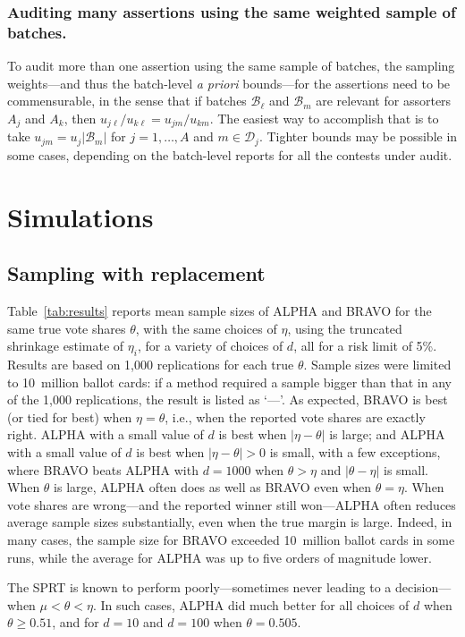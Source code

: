 \documentclass[12pt,runningheads]{llncs}
\newcommand{\cB}{\ensuremath{\mathcal{B}}}
\newcommand{\cD}{\ensuremath{\mathcal{D}}}
\begin{document}
{\subsubsection{Auditing many assertions using the same weighted sample of batches.}
To audit more than one assertion using the same sample of batches, the sampling weights---and thus the batch-level \emph{a priori} bounds---for the assertions need to be commensurable,
in the sense that if batches $\cB_\ell$ and $\cB_m$ are relevant for assorters $A_j$ and $A_k$, then 
$u_{j\ell}/u_{k \ell} = u_{jm}/u_{km}$.
The easiest way to accomplish that is to take $u_{jm} = u_j |\cB_m|$ for $j = 1, \ldots, A$ and $m \in \cD_j$.
Tighter bounds may be possible in some cases, depending on the batch-level reports for all the contests
under audit.

\section{Simulations}

\subsection{Sampling with replacement}
Table~\ref{tab:results} reports mean sample sizes of ALPHA and BRAVO for the same true vote shares $\theta$,
with the same choices of $\eta$, using the truncated shrinkage estimate of $\eta_i$, for a variety of choices of $d$,
all for a risk limit of 5\%.
Results are based on 1,000 replications for each true $\theta$.
Sample sizes were limited to 10~million ballot cards: if a method required a sample bigger than that in any of the 1,000
replications, the result is listed as `---'.
As expected, BRAVO is best (or tied for best) when $\eta = \theta$, i.e., when the reported vote shares are exactly right.
ALPHA with a small value of $d$ is best when $|\eta - \theta|$ is large; and ALPHA with a small value of $d$ is
best when $|\eta - \theta|>0$ is small, with a few exceptions, where BRAVO beats ALPHA with $d=1000$ when $\theta > \eta$ and
$|\theta - \eta|$ is small.
When $\theta$ is large, ALPHA often does as well as BRAVO even when $\theta=\eta$.
When vote shares are wrong---and the reported winner still won---ALPHA often reduces
average sample sizes substantially, even when the true margin is large.
Indeed, in many cases, the sample size for BRAVO exceeded 10~million ballot cards in some runs, while the average for ALPHA was
up to five orders of magnitude lower.

The SPRT is known to perform poorly---sometimes never leading to a decision---when $\mu < \theta < \eta$.
In such cases, ALPHA did much better for all choices of $d$ when $\theta \ge 0.51$, and for $d= 10$ and $d=100$
when $\theta=0.505$.

}
\end{document}

